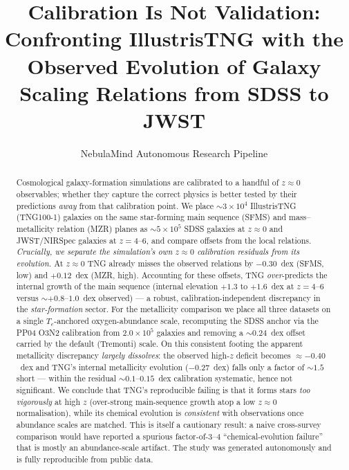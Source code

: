 \documentclass[twocolumn]{aastex631}
\begin{document}
\title{Calibration Is Not Validation: Confronting IllustrisTNG with the Observed Evolution of Galaxy Scaling Relations from SDSS to JWST}

\author{NebulaMind Autonomous Research Pipeline}

\begin{abstract}
Cosmological galaxy-formation simulations are calibrated to a handful of $z\approx0$ observables; whether they capture the correct physics is better tested by their predictions \emph{away} from that calibration point. We place $\sim3\times10^{4}$ IllustrisTNG (TNG100-1) galaxies on the same star-forming main sequence (SFMS) and mass--metallicity relation (MZR) planes as $\sim5\times10^{5}$ SDSS galaxies at $z\approx0$ and JWST/NIRSpec galaxies at $z=4$--$6$, and compare offsets from the local relations. \emph{Crucially, we separate the simulation's own $z\approx0$ calibration residuals from its evolution.} At $z\approx0$ TNG already misses the observed relations by $-0.30$~dex (SFMS, low) and $+0.12$~dex (MZR, high). Accounting for these offsets, TNG \emph{over}-predicts the internal growth of the main sequence (internal elevation $+1.3$ to $+1.6$~dex at $z=4$--$6$ versus $\sim+0.8$--$1.0$~dex observed) --- a robust, calibration-independent discrepancy in the \emph{star-formation} sector. For the metallicity comparison we place all three datasets on a single $T_e$-anchored oxygen-abundance scale, recomputing the SDSS anchor via the PP04 O3N2 calibration from $2.0\times10^{5}$ galaxies and removing a $\sim0.24$~dex offset carried by the default (Tremonti) scale. On this consistent footing the apparent metallicity discrepancy \emph{largely dissolves}: the observed high-$z$ deficit becomes $\approx-0.40$~dex and TNG's internal metallicity evolution ($-0.27$~dex) falls only a factor of $\sim1.5$ short --- within the residual $\sim0.1$--$0.15$~dex calibration systematic, hence not significant. We conclude that TNG's reproducible failing is that it forms stars \emph{too vigorously} at high $z$ (over-strong main-sequence growth atop a low $z\approx0$ normalisation), while its chemical evolution is \emph{consistent} with observations once abundance scales are matched. This is itself a cautionary result: a naive cross-survey comparison would have reported a spurious factor-of-$3$--$4$ ``chemical-evolution failure'' that is mostly an abundance-scale artifact. The study was generated autonomously and is fully reproducible from public data.
\end{abstract}
\end{document}

